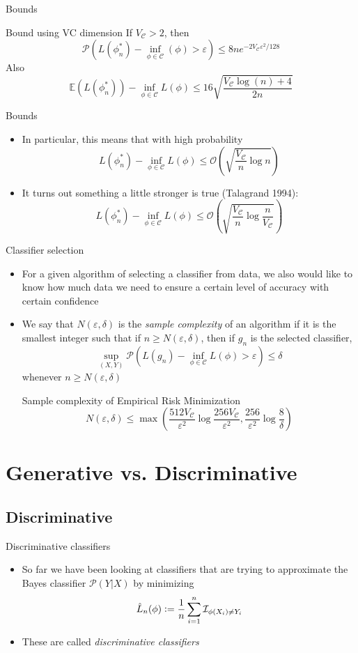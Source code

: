 \documentclass{beamer}
\renewcommand{\Pr}[1]{\mathcal{P} \left( #1 \right)}
\newcommand{\cls}{\mathcal{C}}
\newcommand{\E}[1]{\mathbb{E}\left( #1 \right)}
\newcommand{\defeq}{\vcentcolon=}
\newcommand{\pa}[1]{\left( #1 \right)}
\newcommand{\I}{\mathcal{I}}
\newcommand{\eps}{\varepsilon}
\begin{document}
\begin{frame}{Bounds}
\begin{block}{Bound using VC dimension}
If $V_\cls > 2$, then
\[ \Pr{ L(\phi^*_n) - \inf_{\phi \in \cls} (\phi) > \eps } \leq 8 ne^{-2V_\cls \eps^2/128} \]
Also
\[ \E{L(\phi^*_n)} - \inf_{\phi\in\cls} L(\phi) \leq 16 \sqrt{\frac{V_\cls \log(n) + 4}{2n}} \]
\end{block}
\end{frame}

\begin{frame}{Bounds}
\begin{itemize}
\item In particular, this means that with high probability
\[ L(\phi^*_n) - \inf_{\phi\in\cls} L(\phi) \leq \mathcal{O}\pa{\sqrt{\frac{V_\cls}{n} \log n }} \]
\item It turns out something a little stronger is true (Talagrand 1994):
\[ L(\phi^*_n) - \inf_{\phi\in\cls} L(\phi) \leq \mathcal{O}\pa{\sqrt{\frac{V_\cls}{n} \log\frac{n}{V_\cls}}} \]
\end{itemize}
\end{frame}


\begin{frame}{Classifier selection}
\begin{itemize}
\item For a given algorithm of selecting a classifier from data, we also would like to know how much data we need to ensure a certain level of accuracy with certain confidence
\item We say that $N(\eps,\delta)$ is the \emph{sample complexity} of an algorithm if it is the smallest integer such that if $n \geq N(\eps,\delta)$, then if $g_n$ is the selected classifier,
\[ \sup_{(X,Y)} \Pr{ L(g_n) - \inf_{\phi \in \cls} L(\phi) > \eps} \leq \delta \]
whenever $n \geq N(\eps,\delta)$
\begin{block}{Sample complexity of Empirical Risk Minimization}
\[ N(\eps, \delta) \leq \max\pa{ \frac{512 V_\cls}{\eps^2} \log\frac{256V_\cls}{\eps^2}, \frac{256}{\eps^2}\log\frac8\delta}\]
\end{block}
\end{itemize}
\end{frame}

\section{Generative vs. Discriminative}
\subsection{Discriminative}
\begin{frame}{Discriminative classifiers}
\begin{itemize}
\item So far we have been looking at classifiers that are trying to approximate the Bayes classifier $\Pr{Y|X}$ by minimizing
\[ \hat{L}_n(\phi) \defeq \frac1n \sum_{i=1}^n \I_{\phi(X_i) \ne Y_i} \]
\item These are called \emph{discriminative classifiers}
\end{itemize}
\end{frame}
\end{document}

